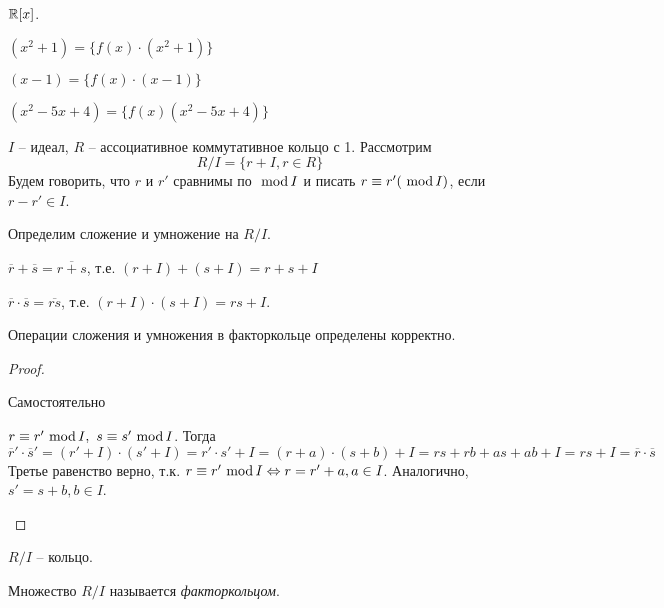 \begin{Example}
	$\mathbb{R}[x]$. 
	\begin{MyItemize}
		\item $(x^2 + 1) = \{f(x) \cdot (x^2 + 1)\}$ 
		\item $(x - 1) = \{f(x) \cdot (x - 1)\}$ 
		\item $(x^2 - 5x + 4) = \{f(x) (x^2 - 5x + 4)\}$ 
	\end{MyItemize}  
\end{Example}

\begin{Def}
	$I$ -- идеал, $R$ -- ассоциативное коммутативное кольцо с 1. Рассмотрим 
	\[R/I = \{r + I, r \in R\}\]
	Будем говорить, что $r$ и $r'$ сравнимы по $\ \mathrm{mod}\, I$ и писать $r \equiv r' (\ \mathrm{mod}\, I)$, если $r - r' \in I$.  

	Определим сложение и умножение на $R/I$.
	\begin{MyList}
		\item $\overline{r} + \overline{s} = \overline{r + s}$, т.е. $(r + I) + (s + I) = r + s + I$
		\item $\overline{r} \cdot \overline{s} = \overline{rs}$, т.е. $(r + I) \cdot (s + I) = rs + I$.
	\end{MyList}
\end{Def}

\begin{Thm}
	Операции сложения и умножения в факторкольце определены корректно.
\end{Thm}

\begin{proof}
	\begin{MyList}
		\item Самостоятельно
		\item $r \equiv r' \ \mathrm{mod}\, I, \ s \equiv s' \ \mathrm{mod}\, I$.
		Тогда 
		\[\overline{r}' \cdot \overline{s}' = (r' + I) \cdot (s' + I) = r' \cdot s' + I = (r + a) \cdot (s + b) + I = rs + rb +  as + ab + I = rs + I = \overline{r} \cdot \overline{s}\]
		Третье равенство верно, т.к. $r \equiv r' \ \mathrm{mod}\, I \Leftrightarrow r = r' + a, a \in I$. Аналогично, $s' = s + b, b \in I$. 
	\end{MyList} 
\end{proof}

\begin{Thm}
	$R/I$ -- кольцо.
\end{Thm}

\begin{Def}
	Множество $R/I$ называется \textit{факторкольцом}.
\end{Def}


